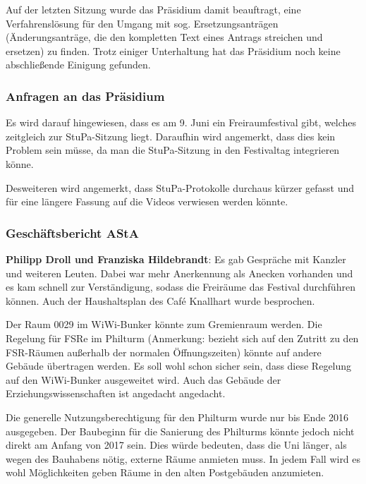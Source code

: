 \documentclass[ngerman,headheight=70pt]{scrartcl}
\begin{document}
    Auf der letzten Sitzung wurde das Präsidium damit beauftragt, eine Verfahrenslösung
    für den Umgang mit sog. Ersetzungsanträgen (Änderungsanträge, die den kompletten
    Text eines Antrags streichen und ersetzen) zu finden. Trotz einiger Unterhaltung
    hat das Präsidium noch keine abschließende Einigung gefunden.

    \subsubsection{Anfragen an das Präsidium}

    Es wird darauf hingewiesen, dass es am 9. Juni ein Freiraumfestival gibt,
    welches zeitgleich zur StuPa-Sitzung liegt. Daraufhin wird angemerkt,
    dass dies kein Problem sein müsse, da man die StuPa-Sitzung in den
    Festivaltag integrieren könne.

    Desweiteren wird angemerkt, dass StuPa-Protokolle durchaus kürzer gefasst
    und für eine längere Fassung auf die Videos verwiesen werden könnte.

    \subsubsection{Geschäftsbericht AStA}

    \textbf{Philipp Droll und Franziska Hildebrandt}: Es gab Gespräche mit
    Kanzler und weiteren Leuten. Dabei war mehr Anerkennung als Anecken vorhanden
    und es kam schnell zur Verständigung, sodass die Freiräume das Festival
    durchführen können. Auch der Haushaltsplan des Café Knallhart wurde besprochen.

    Der Raum 0029 im WiWi-Bunker könnte zum Gremienraum werden. Die Regelung für
    FSRe im Philturm (Anmerkung: bezieht sich auf den Zutritt zu den FSR-Räumen
    außerhalb der normalen Öffnungszeiten) könnte auf andere Gebäude übertragen
    werden. Es soll wohl schon sicher sein, dass diese Regelung auf den WiWi-Bunker
    ausgeweitet wird. Auch das Gebäude der Erziehungswissenschaften ist
    angedacht angedacht.

    Die generelle Nutzungsberechtigung für den Philturm wurde nur bis Ende 2016
    ausgegeben. Der Baubeginn für die Sanierung des Philturms könnte jedoch nicht
    direkt am Anfang von 2017 sein. Dies würde bedeuten, dass die Uni länger, als
    wegen des Bauhabens nötig, externe Räume anmieten muss. In jedem Fall wird es
    wohl Möglichkeiten geben Räume in den alten Postgebäuden anzumieten.
\end{document}
